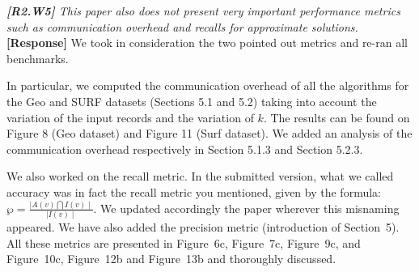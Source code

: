 \documentclass[11pt]{letter}
\newcommand{\svs}{\vspace{0.36ex}}
\newcommand{\TODOREP}[1]{\textcolor{green}{\textbf{[TODO:#1]}}}
\begin{document}


\svs
\noindent
{\em
{\bf [R2.W5]}
This paper also does not present very important performance metrics
such as communication overhead and recalls for approximate solutions.}\\
\textbf{[Response]}
We took in consideration the two pointed out metrics and re-ran all benchmarks. 

In particular, we computed the communication overhead of all the algorithms for the Geo and SURF datasets (Sections 5.1 
and 5.2) taking into account the variation of the input records and the variation of $k$. The results can be found on 
Figure 8 (Geo dataset) and Figure 11 (Surf dataset). We added an analysis of the communication overhead respectively in 
Section 5.1.3 and Section 5.2.3.

We also worked on the recall metric. In the submitted version, what we called accuracy was in fact the recall metric 
you mentioned, given by the formula: $\wp = \frac{\mid A(v) \bigcap I(v) \mid}{\mid  I(v) \mid}$. We updated 
accordingly the paper wherever this misnaming appeared.
We have also added the precision metric (introduction of Section~5). All these metrics are presented in Figure~6c, 
Figure~7c, Figure~9c, and Figure~10c, Figure~12b and Figure~13b and thoroughly discussed. 
\end{document}
